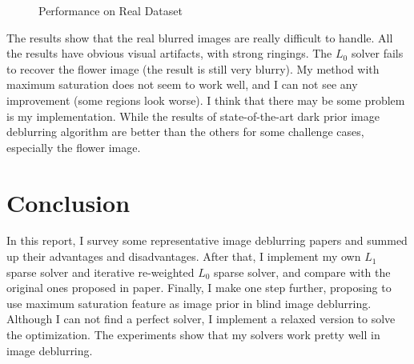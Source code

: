 \documentclass[journal, onecolumn, 10pt]{IEEEtran}
\begin{document}
\begin{figure}[h!]
\hspace{\fill}
\hspace{\fill}
\hspace{\fill}
\label{fig:exp_real}
\caption{Performance on Real Dataset}
\end{figure}

The results show that the real blurred images are really difficult to handle. 
All the results have obvious visual artifacts, with strong ringings. The $L_0$ solver\cite{xu2013unnatural} fails to recover the flower image (the result is still very blurry). My method with maximum saturation does not seem to work well, and I can not see any improvement (some regions look worse). I think that there may be some problem is my implementation. While the results of state-of-the-art dark prior image deblurring algorithm are better than the others for some challenge cases, especially the flower image.

\section{Conclusion}
In this report, I survey some representative image deblurring papers and summed up their advantages and disadvantages. After that, I implement my own $L_1$ sparse solver and iterative re-weighted $L_0$ sparse solver, and compare with the original ones proposed in paper. Finally, I make one step further, proposing to use maximum saturation feature as image prior in blind image deblurring. Although I can not find a perfect solver, I implement a relaxed version to solve the optimization. The experiments show that my solvers work pretty well in image deblurring.

\newpage




\end{document}
